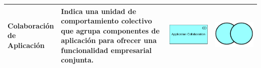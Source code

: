 \begin{longtable}{|p{0.15\linewidth}|p{0.45\linewidth}|p{0.2\linewidth} p{0.2\linewidth}|}
    Colaboración de Aplicación 
    &
    Indica una unidad de comportamiento colectivo que agrupa componentes de aplicación para ofrecer una funcionalidad empresarial conjunta. 
    &
\begin{center}
    \includegraphics[width=1\linewidth]{imgs/capa_aplicacion/Aplication_collaboration.pdf}
\end{center} &
\begin{center}
    \includegraphics[width=0.7\linewidth]{imgs/capa_aplicacion/collaboration.pdf}
\end{center}
    \\ \hline




\end{longtable}

